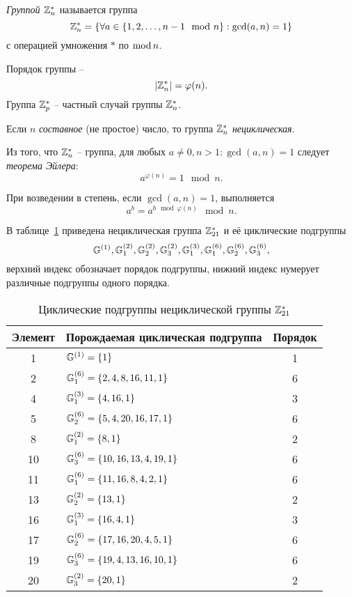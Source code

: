 \emph{Группой $\mathbb{Z}_n^*$} называется группа
    \[ \mathbb{Z}_n^* = \left\{ \forall a \in \left\{ 1, 2, \dots, n-1 \mod n \right\} : \gcd(a,n) = 1 \right\} \]
с операцией умножения $\ast$ по $\operatorname{mod} n$.

Порядок группы --
    \[ |\mathbb{Z}_n^*| = \varphi(n). \]
Группа $\mathbb{Z}_p^*$ -- частный случай группы $\mathbb{Z}_n^*$.

Если $n$ \emph{составное} (не простое) число, то группа $\mathbb{Z}_n^*$ \emph{нециклическая}.

Из того, что $\mathbb{Z}_n^*$ -- группа, для любых $a \neq 0, n > 1: \gcd(a,n) = 1$ следует \emph{теорема Эйлера}:
    \[ a^{\varphi(n)} = 1 \mod n. \]

При возведении в степень, если $\gcd(a,n) = 1$, выполняется
    \[ a^b = a^{b \mod \varphi(n)} \mod n. \]

\example
В таблице~\ref{tab:Zn-sample} приведена нециклическая группа $\mathbb{Z}_{21}^*$ и её циклические подгруппы
    \[ \mathbb{G}^{(1)}, \mathbb{G}_1^{(2)}, \mathbb{G}_2^{(2)}, \mathbb{G}_3^{(2)}, \mathbb{G}_1^{(3)}, \mathbb{G}_1^{(6)}, \mathbb{G}_2^{(6)}, \mathbb{G}_3^{(6)}, \]
верхний индекс обозначает порядок подгруппы, нижний индекс нумерует различные подгруппы одного порядка.

\begin{table}[!ht]
    \centering
    \caption{Циклические подгруппы нециклической группы $\mathbb{Z}_{21}^*$\label{tab:Zn-sample}}
    \begin{tabular}{|c|l|c|}
        \hline
        Элемент & Порождаемая циклическая подгруппа & Порядок \\
        \hline
        1  & $\mathbb{G}^{(1)} = \{ 1 \}$ & 1 \\
        2  & $\mathbb{G}_1^{(6)} = \{ 2, 4, 8, 16, 11, 1 \}$ & 6 \\
        4  & $\mathbb{G}_1^{(3)} = \{ 4, 16, 1 \}$ & 3 \\
        5  & $\mathbb{G}_2^{(6)} = \{ 5, 4, 20, 16, 17, 1 \}$ & 6 \\
        8  & $\mathbb{G}_1^{(2)} = \{ 8, 1 \}$ & 2 \\
        10 & $\mathbb{G}_3^{(6)} = \{ 10, 16, 13, 4, 19, 1 \}$ & 6 \\
        11 & $\mathbb{G}_1^{(6)} = \{ 11, 16, 8, 4, 2, 1 \}$ & 6 \\
        13 & $\mathbb{G}_2^{(2)} = \{ 13, 1 \}$ & 2 \\
        16 & $\mathbb{G}_1^{(3)} = \{ 16, 4, 1 \}$ & 3 \\
        17 & $\mathbb{G}_2^{(6)} = \{ 17, 16, 20, 4, 5, 1 \}$ & 6 \\
        19 & $\mathbb{G}_3^{(6)} = \{ 19, 4, 13, 16, 10, 1 \}$ & 6 \\
        20 & $\mathbb{G}_3^{(2)} = \{ 20, 1 \}$ & 2 \\
        \hline
    \end{tabular}
\end{table}
\exampleend

